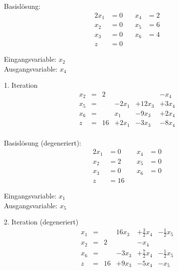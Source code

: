 \documentclass[a4paper]{scrartcl}
\begin{document}
\begin{enumerate}[label=\bfseries\arabic*.]
        Basislösung:
        \begin{alignat*}{2}
            x_1 &= 0 &\quad x_4 &= 2 \\
            x_2 &= 0 &\quad x_5 &= 6 \\
            x_3 &= 0 &\quad x_6 &= 4 \\
            z &= 0
        \end{alignat*}

        Eingangsvariable: $x_2$ \\
        Ausgangsvariable: $x_4$

        1. Iteration
        \begin{equation}
            \begin{array}{rcrrrr}
                x_2 & = & 2 &  &  & -x_4 \\
                x_5 & = &   & -2x_1 & + 12x_3 & +3x_4 \\
                x_6 & = &   & x_1 & -9x_3 & +2x_4 \\
                \hline
                z   & = & 16 & + 2x_1 & -3x_3 & -8x_4 \\
            \end{array}
        \end{equation}

        Basislösung (degeneriert):
        \begin{alignat*}{2}
            x_1 &= 0 &\quad x_4 &= 0 \\
            x_2 &= 2 &\quad x_5 &= 0 \\
            x_3 &= 0 &\quad x_6 &= 0 \\
            z &= 16
        \end{alignat*}

        Eingangsvariable: $x_1$ \\
        Ausgangsvariable: $x_5$

        2. Iteration (degeneriert)
        \begin{equation}
            \begin{array}{rcrrrr}
                x_1 & = &   & 16x_3 & +\frac{3}{2}x_4 & -\frac{1}{2}x_5 \\
                x_2 & = & 2 &  & -x_4 & \\
                x_6 & = &   & -3x_3 & +\frac{7}{2}x_4 & -\frac{1}{2}x_5 \\
                \hline
                z   & = & 16 & +9x_3 & -5x_4 & -x_5\\
            \end{array}
        \end{equation}


\end{enumerate}
\end{document}
